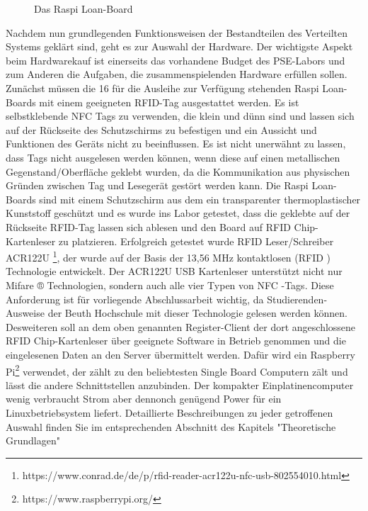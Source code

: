 \begin{figure}
	\caption{Das Raspi Loan-Board }
	\label{fig:click}
\end{figure}
Nachdem nun grundlegenden Funktionsweisen der Bestandteilen des Verteilten Systems geklärt sind, geht es zur Auswahl der Hardware. Der wichtigste Aspekt beim Hardwarekauf ist einerseits das vorhandene Budget des PSE-Labors und zum Anderen die Aufgaben, die zusammenspielenden Hardware erfüllen sollen. Zunächst müssen die 16 für die Ausleihe zur Verfügung stehenden Raspi Loan-Boards mit einem geeigneten RFID-Tag ausgestattet werden. Es ist selbstklebende NFC Tags zu verwenden, die klein und dünn sind und lassen sich auf der Rückseite des Schutzschirms zu befestigen und ein Aussicht und Funktionen des Geräts nicht zu beeinflussen. Es ist nicht unerwähnt zu lassen, dass Tags nicht ausgelesen werden können, wenn diese auf einen metallischen Gegenstand/Oberfläche geklebt wurden, da die Kommunikation aus physischen Gründen zwischen Tag und Lesegerät gestört werden kann. Die Raspi Loan-Boards sind mit einem Schutzschirm aus dem ein transparenter thermoplastischer Kunststoff geschützt und es wurde ins Labor getestet, dass die geklebte auf der Rückseite RFID-Tag lassen sich ablesen und den Board auf RFID Chip-Kartenleser zu platzieren. Erfolgreich getestet wurde RFID Leser/Schreiber ACR122U \footnote{https://www.conrad.de/de/p/rfid-reader-acr122u-nfc-usb-802554010.html}, der wurde auf der Basis der 13,56 MHz kontaktlosen (RFID ) Technologie entwickelt. Der ACR122U USB Kartenleser unterstützt nicht nur Mifare ® Technologien, sondern auch alle vier Typen von NFC -Tags. Diese Anforderung ist für vorliegende Abschlussarbeit wichtig, da Studierenden-Ausweise der Beuth Hochschule mit dieser Technologie gelesen werden können. Desweiteren soll an dem oben genannten Register-Client der dort angeschlossene RFID Chip-Kartenleser über geeignete Software in Betrieb genommen und die eingelesenen Daten an den Server übermittelt werden. Dafür wird ein Raspberry Pi\footnote{https://www.raspberrypi.org/} verwendet, der zählt zu den beliebtesten Single Board Computern zält und lässt die andere Schnittstellen anzubinden. Der kompakter Einplatinencomputer wenig verbraucht Strom aber dennonch genügend Power für ein Linuxbetriebsystem liefert. Detaillierte Beschreibungen zu jeder getroffenen Auswahl finden Sie im entsprechenden Abschnitt des Kapitels "Theoretische Grundlagen"



 
 